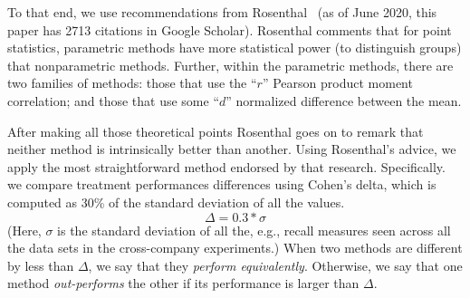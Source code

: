 \documentclass[10pt,compsoc,twocolumn]{IEEEtran}
\begin{document}
To that end, we
use recommendations from
Rosenthal~\cite{rosenthal1994parametric}
(as of June 2020,  this paper has 2713  citations in Google Scholar).  Rosenthal comments that for point statistics, 
  parametric methods have more statistical power (to distinguish groups) that nonparametric methods. Further, within the parametric methods, there are two families of methods: 
  those that use the
  ``$r$''  Pearson product moment correlation;
  and
  those that use some ``$d$'' normalized difference between the mean.

  After making all those theoretical points Rosenthal goes on to remark that  neither method is intrinsically better than another.
Using Rosenthal's advice, we apply the most straightforward method endorsed by that research.   Specifically. we compare  treatment performances differences using Cohen's delta, which is computed as 30\% of the standard deviation of all the values.
\begin{equation}\label{se:cohen}
\Delta = 0.3*\sigma
\end{equation}
(Here, $\sigma$ is the standard deviation of all the, e.g., recall measures seen across all the data sets in the cross-company experiments.)
When two methods are different by less than $\Delta$, we say that they {\em  perform equivalently}. 
Otherwise,  we say that one method {\em out-performs} the other if its performance is larger than
$\Delta$.

 
 




\end{document}
